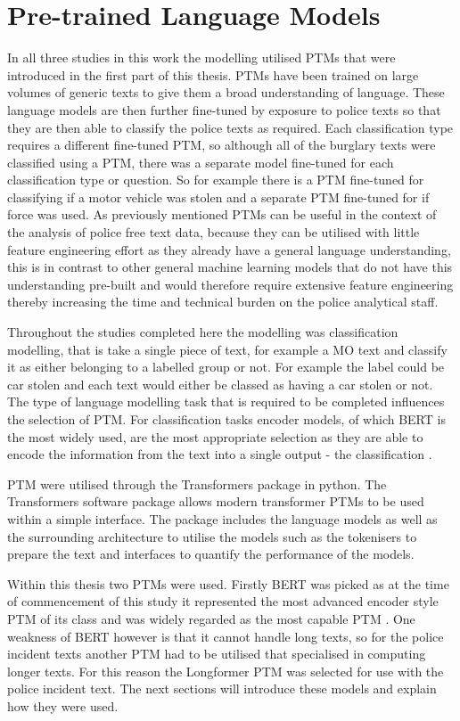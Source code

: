 \section{Pre-trained Language Models} In all three studies in this work the modelling utilised PTMs that were introduced in the first part of this thesis. PTMs have been trained on large volumes of generic texts to give them a broad understanding of language. These language models are then further fine-tuned by exposure to police texts so that they are then able to classify the police texts as required. Each classification type requires a different fine-tuned PTM, so although all of the burglary texts were classified using a PTM, there was a separate model fine-tuned for each classification type or question. So for example there is a PTM fine-tuned for classifying if a motor vehicle was stolen and a separate PTM fine-tuned for if force was used. As previously mentioned PTMs can be useful in the context of the analysis of police free text data, because they can be utilised with little feature engineering effort as they already have a general language understanding, this is in contrast to other general machine learning models that do not have this understanding pre-built and would therefore require extensive feature engineering thereby increasing the time and technical burden on the police analytical staff. 


Throughout the studies completed here the modelling was classification modelling, that is take a single piece of text, for example a MO text and classify it as either belonging to a labelled group or not. For example the label could be car stolen and each text would either be classed as having a car stolen or not. The type of language modelling task that is required to be completed influences the selection of PTM. For classification tasks encoder models, of which BERT is the most widely used, are the most appropriate selection as they are able to encode the information from the text into a single output - the classification \parencite{PTMsurvey}. 

PTM were utilised through the Transformers package \parencite{wolf2019huggingface} in python. The Transformers software package allows modern transformer PTMs to be used within a simple interface. The package includes the language models as well as the surrounding architecture to utilise the models such as the tokenisers to prepare the text and interfaces to quantify the performance of the models.

Within this thesis two PTMs were used. Firstly BERT was picked as at the time of commencement of this study it represented the most advanced encoder style PTM of its class and was widely regarded as the most capable PTM \parencite{PTMsurvey}. One weakness of BERT however is that it cannot handle long texts, so for the police incident texts another PTM had to be utilised that specialised in computing longer texts. For this reason the Longformer PTM was selected for use with the police incident text. The next sections will introduce these models and explain how they were used.


